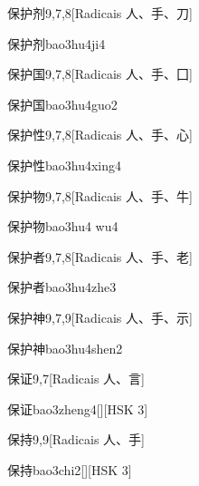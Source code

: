 \begin{entry}{保护剂}{9,7,8}[Radicais ⼈、⼿、⼑]
  \begin{phonetics}{保护剂}{bao3hu4ji4}
  \end{phonetics}
\end{entry}

\begin{entry}{保护国}{9,7,8}[Radicais ⼈、⼿、⼞]
  \begin{phonetics}{保护国}{bao3hu4guo2}
  \end{phonetics}
\end{entry}

\begin{entry}{保护性}{9,7,8}[Radicais ⼈、⼿、⼼]
  \begin{phonetics}{保护性}{bao3hu4xing4}
  \end{phonetics}
\end{entry}

\begin{entry}{保护物}{9,7,8}[Radicais ⼈、⼿、⽜]
  \begin{phonetics}{保护物}{bao3hu4 wu4}
  \end{phonetics}
\end{entry}

\begin{entry}{保护者}{9,7,8}[Radicais ⼈、⼿、⽼]
  \begin{phonetics}{保护者}{bao3hu4zhe3}
  \end{phonetics}
\end{entry}

\begin{entry}{保护神}{9,7,9}[Radicais ⼈、⼿、⽰]
  \begin{phonetics}{保护神}{bao3hu4shen2}
  \end{phonetics}
\end{entry}

\begin{entry}{保证}{9,7}[Radicais ⼈、⾔]
  \begin{phonetics}{保证}{bao3zheng4}[][HSK 3]
  \end{phonetics}
\end{entry}

\begin{entry}{保持}{9,9}[Radicais ⼈、⼿]
  \begin{phonetics}{保持}{bao3chi2}[][HSK 3]
  \end{phonetics}
\end{entry}

